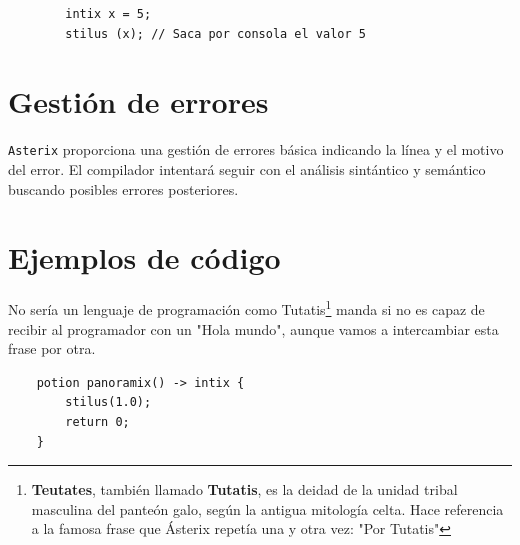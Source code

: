 \documentclass[a4paper, 10pt]{article}
\newcommand{\atx}{\texttt{Asterix} }
\begin{document}
    \begin{verbatim}
        intix x = 5;
        stilus (x); // Saca por consola el valor 5
    \end{verbatim}

    \section*{Gestión de errores}
    \atx proporciona una gestión de errores básica indicando la línea y el motivo
    del error. El compilador intentará seguir con el análisis sintántico y semántico
    buscando posibles errores posteriores.

    \section*{Ejemplos de código}
    No sería un lenguaje de programación como
    Tutatis\footnote{\textbf{Teutates}, también llamado \textbf{Tutatis}, es la
    deidad de la unidad tribal masculina del panteón galo, según la antigua
    mitología celta. Hace referencia a la famosa frase que Ásterix repetía una
    y otra vez: "Por Tutatis"} manda si no es capaz de recibir al programador
    con un "Hola mundo", aunque vamos a intercambiar esta frase por otra.
    
    \begin{verbatim}
    potion panoramix() -> intix {
        stilus(1.0);
        return 0;
    }
    \end{verbatim}
    
\end{document}
